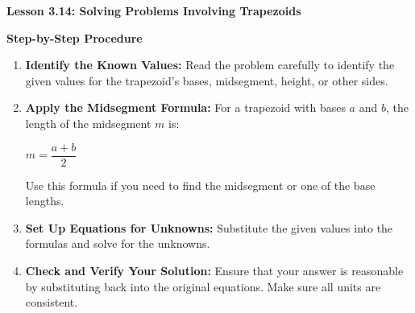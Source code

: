 \begin{center}
\textbf{Lesson 3.14: Solving Problems Involving Trapezoids}
\end{center}

\vspace*{-1.5ex}

\noindent\textbf{Step-by-Step Procedure}

\begin{enumerate}[label=\color{blue}\arabic*.]
    \item \textbf{Identify the Known Values:} Read the problem carefully to identify the given values for the trapezoid’s bases, midsegment, height, or other sides.
    
    \item \textbf{Apply the Midsegment Formula:} For a trapezoid with bases \(a\) and \(b\), the length of the midsegment \(m\) is:
      
    {\centering $ 
    m = \dfrac{a + b}{2}
    $\par}
  
    Use this formula if you need to find the midsegment or one of the base lengths.
    
  
    \item \textbf{Set Up Equations for Unknowns:} Substitute the given values into the formulas and solve for the unknowns.
    
    \item \textbf{Check and Verify Your Solution:} Ensure that your answer is reasonable by substituting back into the original equations. Make sure all units are consistent.
\end{enumerate}

